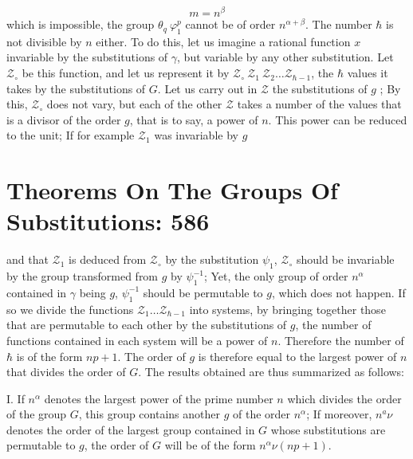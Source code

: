 \documentclass[11pt,fancy]{elegantbook}
\begin{document}
\begin{equation}
    m = n^\beta
\end{equation}
which is impossible, the group $\theta_q \ \varphi_1^{p}$ cannot be of order $n^{\alpha+\beta}$.
The number $\hbar$ is not divisible by $n$ either. To do this, let us imagine a rational function $x$ invariable by the substitutions of $\gamma$, but variable by any other substitution. Let $\mathcal{Z_\circ}$ be this function, and let us represent it by ${\mathcal Z_\circ \ \mathcal{Z}_1 \ \mathcal{Z}_2 \dots \mathcal{Z}_{\hbar-1}}$, the $\hbar$ values it takes by the substitutions of $G$. Let us carry out in $\mathcal{Z}$ the substitutions of $g$ ; By this, $\mathcal{Z}_\circ$ does not vary, but each of the other $\mathcal{Z}$ takes a number of the values that is a divisor of the order $g$, that is to say, a power of $n$. This power can be reduced to the unit; If for example $\mathcal{Z}_1$ was invariable by $g$

\section{Theorems On The Groups Of Substitutions: 586}
and that $\mathcal{Z}_1$ is deduced from $\mathcal{Z}_\circ$ by the substitution $\psi_1$, $\mathcal{Z}_\circ$ should be invariable by the group transformed from $g$ by $\psi_1^{-1}$; Yet, the only group of order $n^\alpha$ contained in $\gamma$ being $g$, $\psi_1^{-1}$ should be permutable to $g$, which does not happen. If so we divide the functions $\mathcal{Z}_1 \dots \mathcal{Z}_{\hbar-1}$ into systems, by bringing together those that are permutable to each other by the substitutions of $g$, the number of functions contained in each system will be a power of $n$. Therefore the number of $\hbar$ is of the form $np + 1$. The order of $g$ is therefore equal to the largest power of $n$ that divides the order of $G$. The results obtained are thus summarized as follows:
\begin{theorem}
I.  If $n^\alpha$ denotes the largest power of the prime number $n$ which divides the order of the group $G$, this group contains another $g$ of the order $n^\alpha$; If moreover, $n^{a}\nu$ denotes the order of the largest group contained in $G$ whose substitutions are permutable to $g$, the order of $G$ will be of the form $n^\alpha{\nu(np + 1)}$.  
\end{theorem}
\end{document}
